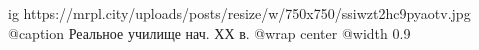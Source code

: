  
 
 
 
 

\ifcmt
  ig https://mrpl.city/uploads/posts/resize/w/750x750/ssiwzt2hc9pyaotv.jpg
	@caption Реальное училище нач. ХХ в.
  @wrap center
  @width 0.9
\fi
